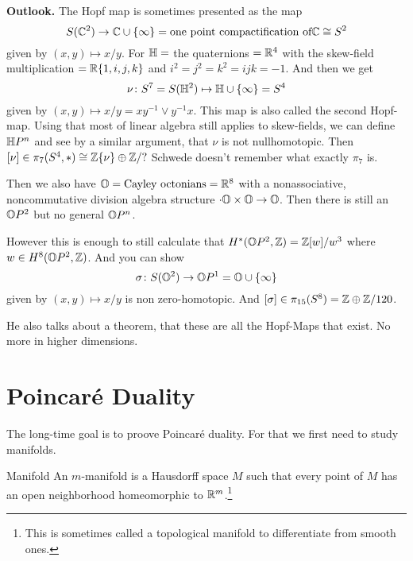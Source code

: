 \documentclass[language=english]{TemplateLecture}
\begin{document}
\textbf{Outlook.} The Hopf map is sometimes presented as the map
\[S(\mathbb{C}^2) \to \mathbb{C} \cup \{\infty\} = \text{one point compactification of} \mathbb{C} \cong S^2\]
given by \((x,y) \mapsto x/y\). For \(\mathbb{H} =\) the quaternions \(= \mathbb{R}^4\) with the skew-field multiplication \(= \mathbb{R}\{1,i,j,k\}\) and \(i^2 = j^2 = k^2 = ijk = -1\). And then we get
\[\nu \colon S^7 = S(\mathbb{H}^2) \mapsto \mathbb{H} \cup \{\infty\} = S^4\]
given by \((x,y) \mapsto x/y = xy^{-1} \vee y^{-1}x\). This map is also called the second Hopf-map. Using that most of linear algebra still applies to skew-fields, we can define \(\mathbb{H} P^n\) and see by a similar argument, that \(\nu\) is not nullhomotopic. Then \([\nu] \in \pi_7(S^4, *) \cong \mathbb{Z}\{\nu\} \oplus \mathbb{Z}/?\)
Schwede doesn't remember what exactly \(\pi_7\) is.

Then we also have \(\mathbb{O} = \text{Cayley octonians} = \mathbb{R}^8\) with a nonassociative, noncommutative division algebra structure \(\cdot \mathbb{O} \times \mathbb{O} \to \mathbb{O}\). Then there is still an \(\mathbb{O} P^2\) but no general \(\mathbb{O} P^n\).

However this is enough to still calculate that \(H^*(\mathbb{O} P^2, \mathbb{Z}) = \mathbb{Z}[w]/w^3\) where \(w \in H^8(\mathbb{O} P^2, \mathbb{Z})\). And you can show
\[\sigma \colon S(\mathbb{O}^2) \to \mathbb{O} P^1 = \mathbb{O} \cup \{\infty\}\]
given by \((x,y) \mapsto x/y\) is non zero-homotopic. And \([\sigma] \in \pi_{15}(S^8) = \mathbb{Z} \oplus \mathbb{Z}/120\).

He also talks about a theorem, that these are all the Hopf-Maps that exist. No more in higher dimensions.


\chapter{Poincaré Duality}

The long-time goal is to proove Poincaré duality. For that we first need to study manifolds.

\begin{defi}{Manifold}{}
    An \(m\)-manifold  is a Hausdorff space \(M\) such that every point of \(M\) has an open neighborhood homeomorphic to \(\mathbb{R}^m\).\footnote{This is sometimes called a topological manifold to differentiate from smooth ones.}
\end{defi}
\end{document}
